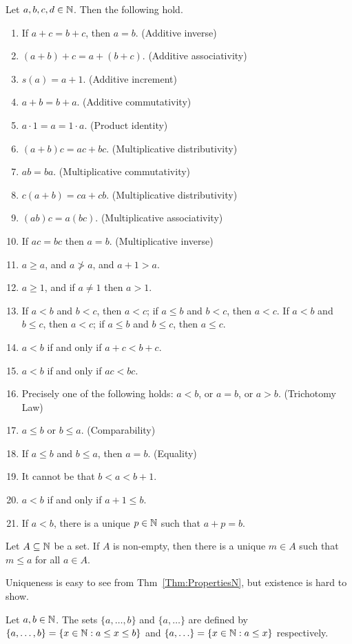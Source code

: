 \documentclass[a4paper,english,12pt]{article}
\begin{document}
\begin{thm}\label{Thm:PropertiesN} Let $a,b,c,d \in \mathbb{N}$. Then the following hold.
\begin{enumerate}
	\item If $a+c=b+c$, then $a=b$. (Additive inverse)
	\item $(a + b) + c = a + (b + c)$. (Additive associativity)
	\item $s(a)=a+1$. (Additive increment)
	\item $a+b=b+a$. (Additive commutativity)
	\item $a \cdot 1 = a = 1 \cdot a$. (Product identity)
	\item $(a+b)c = ac + bc$. (Multiplicative distributivity)
	\item $ab = ba$. (Multiplicative commutativity)
	\item $c(a+b)=ca+cb$. (Multiplicative distributivity)
	\item $(ab)c = a(bc)$. (Multiplicative associativity)
	\item If $ac=bc$ then $a=b$. (Multiplicative inverse)
	\item $a \geq a$, and $a\ngtr a$, and $a+1 > a$.
	\item $a \geq 1$, and if $a \neq 1$ then $a > 1$.
	\item If $a < b$ and $b < c$, then $a<c$; if $a\leq b$ and $b < c$, then $a < c$. If $a < b$ and $b \leq c$, then $a < c$; if $a \leq b$ and $b \leq c$, then $a \leq c$.
	\item $a < b$ if and only if $a+c < b+c$.
	\item $a < b$ if and only if $ac < bc$.
	\item Precisely one of the following holds: $a<b$, or $a=b$, or $a>b$. (Trichotomy Law)
	\item $a \leq b$ or $b \leq a$. (Comparability)
	\item If $a \leq b$ and $b \leq a$, then $a=b$. (Equality)
	\item It cannot be that $b < a < b+1$.
	\item $a < b$ if and only if $a + 1 \leq b$.
	\item If $a < b$, there is a unique $p \in \mathbb{N}$ such that $a + p = b$.
\end{enumerate}
\end{thm}

\begin{thm} Let $A \subseteq \mathbb{N}$ be a set. If $A$ is non-empty, then there is a unique $m \in A$ such that $m \leq a$ for all $a \in A$.
\end{thm}
\begin{rem} Uniqueness is easy to see from Thm~\ref{Thm:PropertiesN}, but existence is hard to show.
\end{rem}
\begin{defn} Let $a, b \in \mathbb{N}$. The sets $\{a,\ldots, b\}$ and $\{a,\ldots\}$ are defined by $\{a,\ldots, b\} = \{x \in \mathbb{N}: a \leq x \leq b\}$ and $\{a,\ldots\} = \{x \in \mathbb{N}: a \leq x\}$ respectively.
\end{defn}
\end{document}
